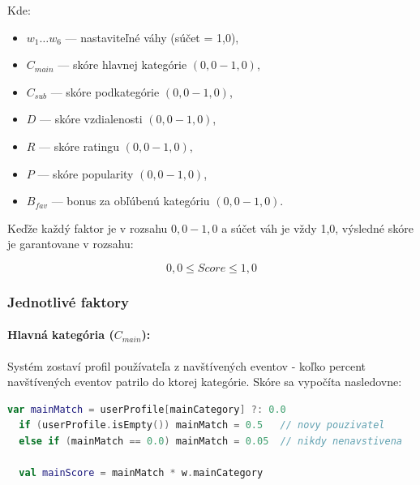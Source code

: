   Kde:
  \begin{itemize}[noitemsep, nolistsep]
      \item $w_1 \ldots w_6$ — nastaviteľné váhy (súčet = 1,0),
      \item $C_{main}$ — skóre hlavnej kategórie $(0{,}0 - 1{,}0)$,
      \item $C_{sub}$ — skóre podkategórie $(0{,}0 - 1{,}0)$,
      \item $D$ — skóre vzdialenosti $(0{,}0 - 1{,}0)$,
      \item $R$ — skóre ratingu $(0{,}0 - 1{,}0)$,
      \item $P$ — skóre popularity $(0{,}0 - 1{,}0)$,
      \item $B_{fav}$ — bonus za obľúbenú kategóriu $(0{,}0 - 1{,}0)$.
  \end{itemize}

  Keďže každý faktor je v rozsahu $0{,}0 - 1{,}0$ a súčet váh je vždy
  1,0, výsledné skóre je garantovane v rozsahu:

  \begin{equation}
  0{,}0 \leq Score \leq 1{,}0
  \end{equation}

  \subsubsection{Jednotlivé faktory}

  \paragraph{Hlavná kategória ($C_{main}$):}
  Systém zostaví profil používateľa z navštívených eventov - koľko percent
  navštívených eventov patrilo do ktorej kategórie. Skóre sa vypočíta
  nasledovne:

  \begin{lstlisting}[language=Kotlin, caption=Výpočet skóre hlavnej kategórie]
  var mainMatch = userProfile[mainCategory] ?: 0.0
  if (userProfile.isEmpty()) mainMatch = 0.5   // novy pouzivatel
  else if (mainMatch == 0.0) mainMatch = 0.05  // nikdy nenavstivena

  val mainScore = mainMatch * w.mainCategory
  \end{lstlisting}

